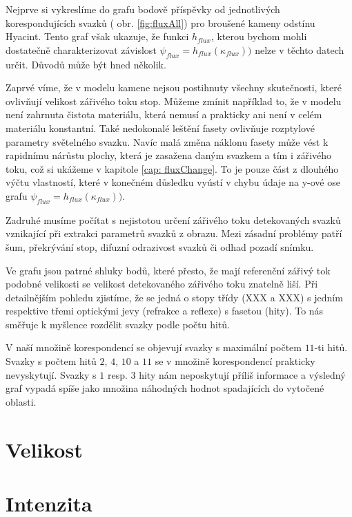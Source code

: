 Nejprve si vykreslíme do grafu bodově příspěvky od jednotlivých korespondujících svazků ( obr. \ref{fig:fluxAll}) pro broušené kameny odstínu Hyacint. Tento graf však ukazuje, že funkci $h_{flux}$, kterou bychom mohli dostatečně charakterizovat závislost $\psi_{flux} = h_{flux}\left( \kappa_{flux} \right))$ nelze v těchto datech určit. Důvodů může být hned několik. 

Zaprvé víme, že v modelu kamene nejsou postihnuty všechny skutečnosti, které ovlivňují velikost zářivého toku stop. Můžeme zmínit například to, že v modelu není zahrnuta čistota materiálu, která nemusí a prakticky ani není v celém materiálu konstantní. Také nedokonalé leštění fasety ovlivňuje rozptylové parametry světelného svazku. Navíc malá změna náklonu fasety může vést k rapidnímu nárůstu plochy, která je zasažena daným svazkem a tím i zářivého toku, což si ukážeme v kapitole \ref{cap: fluxChange}. To je pouze část z dlouhého výčtu vlastností, které v konečném důsledku vyústí v chybu údaje na y-ové ose grafu 
$\psi_{flux} = h_{flux}\left( \kappa_{flux} \right))$.

Zadruhé musíme počítat s nejistotou určení zářivého toku detekovaných svazků vznikající při extrakci parametrů svazků z obrazu. Mezi zásadní problémy patří šum, překrývání stop, difuzní odrazivost svazků či odhad pozadí snímku.  


Ve grafu jsou patrné shluky bodů, které přesto, že mají referenční zářivý tok podobné velikosti se velikost detekovaného zářivého toku znatelně liší. Při detailnějším pohledu zjistíme, že se jedná o stopy třídy (XXX a XXX) s jedním respektive třemi optickými jevy (refrakce a reflexe) s fasetou (hity). To nás směřuje k myšlence rozdělit svazky podle počtu hitů. 

V naší množině korespondencí se objevují svazky s maximální počtem $11$-ti hitů. Svazky s počtem hitů $2$, $4$, $10$ a $11$ se v množině korespondencí prakticky nevyskytují. Svazky s $1$ resp. $3$ hity nám neposkytují příliš informace a výsledný graf vypadá spíše jako množina náhodných hodnot spadajících do vytočené oblasti.   





\section*{Velikost}

\section*{Intenzita}

